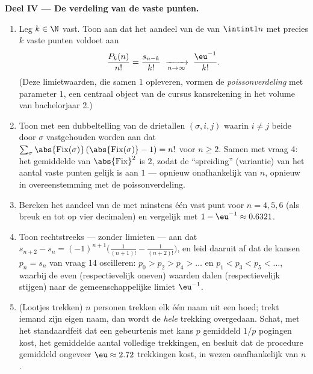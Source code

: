 \begin{problem}
\medskip
\noindent\textbf{Deel IV --- De verdeling van de vaste punten.}
\begin{enumerate}[resume]
  \item Leg $k \in \N$ vast. Toon aan dat het aandeel van de 
        van $\intint1n$ met precies $k$ vaste punten voldoet aan
        \[
        \frac{P_k(n)}{n!} = \frac{s_{n-k}}{k!}
        \;\xrightarrow[n \to \infty]{}\; \frac{\eu^{-1}}{k!} .
        \]
        (Deze limietwaarden, die samen $1$ opleveren, vormen de
        \emph{poissonverdeling} met parameter $1$, een centraal object
        van de cursus kansrekening in het volume van bachelorjaar 2.)
  \item Toon met een dubbeltelling van de drietallen $(\sigma, i, j)$
        waarin $i \neq j$ beide door $\sigma$ vastgehouden worden aan
        dat $\sum_\sigma \abs{\mathrm{Fix}(\sigma)}\,
        (\abs{\mathrm{Fix}(\sigma)} - 1) = n!$ voor $n \geq 2$. Samen
        met vraag 4: het gemiddelde van $\abs{\mathrm{Fix}}^2$ is $2$,
        zodat de ``spreiding'' (variantie) van het aantal vaste punten
        gelijk is aan $1$ --- opnieuw onafhankelijk van $n$, opnieuw in
        overeenstemming met de poissonverdeling.
  \item Bereken het aandeel van de  met minstens één vast
        punt voor $n = 4, 5, 6$ (als breuk en tot op vier decimalen) en
        vergelijk met $1 - \eu^{-1} \approx 0.6321$.
  \item Toon rechtstreeks --- zonder limieten --- aan dat $s_{n+2} - s_n
        = (-1)^{n+1}\bigl(\frac1{(n+1)!} - \frac1{(n+2)!}\bigr)$, en
        leid daaruit af dat de kansen $p_n = s_n$ van vraag 14
        oscilleren: $p_0 > p_2 > p_4 > \dots$ en $p_1 < p_3 < p_5 <
        \dots$, waarbij de even (respectievelijk oneven) waarden dalen
        (respectievelijk stijgen) naar de gemeenschappelijke limiet
        $\eu^{-1}$.
  \item (Lootjes trekken) $n$ personen trekken elk één naam uit een
        hoed; trekt iemand zijn eigen naam, dan wordt de \emph{hele}
        trekking overgedaan. Schat, met het standaardfeit dat een
        gebeurtenis met kans $p$ gemiddeld $1/p$ pogingen kost, het
        gemiddelde aantal volledige trekkingen, en besluit dat de
        procedure gemiddeld ongeveer $\eu \approx 2.72$ trekkingen kost,
        in wezen onafhankelijk van $n$.
\end{enumerate}


\end{problem}
